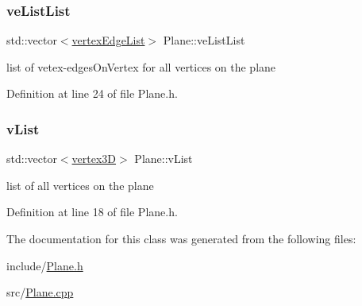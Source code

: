 \subsubsection{\texorpdfstring{ve\+List\+List}{veListList}}
{\footnotesize\ttfamily std\+::vector$<$\mbox{\hyperlink{structvertex_edge_list}{vertex\+Edge\+List}}$>$ Plane\+::ve\+List\+List}



list of vetex-\/edges\+On\+Vertex for all vertices on the plane 



Definition at line 24 of file Plane.\+h.

\mbox{\label{class_plane_a9badd6fb24525ce9605a3f6a5bb0d770}} 
\subsubsection{\texorpdfstring{v\+List}{vList}}
{\footnotesize\ttfamily std\+::vector$<$\mbox{\hyperlink{structvertex3_d}{vertex3D}}$>$ Plane\+::v\+List}



list of all vertices on the plane 



Definition at line 18 of file Plane.\+h.



The documentation for this class was generated from the following files\+:\begin{DoxyCompactItemize}
\item 
include/\mbox{\hyperlink{_plane_8h}{Plane.\+h}}\item 
src/\mbox{\hyperlink{_plane_8cpp}{Plane.\+cpp}}\end{DoxyCompactItemize}
